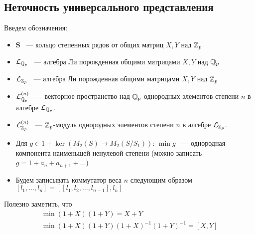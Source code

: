 \subsection{Неточность универсального представления}\label{subsec:zubkov-non-injective}
Введем обозначения:
\begin{itemize}
    \item $\mathbf{S}$ ~--- кольцо степенных рядов от общих матриц $X, Y$ над $\mathbb{Z}_p$
    \item $\mathcal{L}_{\mathbb{Q}_p}$ ~--- алгебра Ли порожденная общими матрицами $X, Y$ над $\mathbb{Q}_p$
    \item $\mathcal{L}_{\mathbb{Z}_p}$ ~--- алгебра Ли порожденная общими матрицами $X, Y$ над $\mathbb{Z}_p$
    \item $\mathcal{L}_{\mathbb{Q}_p}^{(n)}$ ~--- векторное пространство над $\mathbb{Q}_p$ однородных элементов степени $n$ в алгебре $\mathcal{L}_{\mathbb{Q}_p}$.
    \item $\mathcal{L}_{\mathbb{Z}_p}^{(n)}$ ~---  $\mathbb{Z}_p$-модуль однородных элементов степени $n$ в алгебре $\mathcal{L}_{\mathbb{Z}_p}$.
    \item Для $g\in 1 + \ker{(M_2(S) \to M_2(S / S_1))}$: $\min{g}$ ~--- однородная компонента наименьшей ненулевой степени (можно записать $g=1 + a_n + a_{n+1} + \ldots$)
    \item Будем записывать коммутатор веса $n$ следующим образом $[l_1, \ldots, l_n] = [[l_1, l_2, \ldots, l_{n-1}], l_n]$
\end{itemize}

\begin{remark}
    \label{rmk:group-vs-lie-commutator}
    Полезно заметить, что
    \begin{gather*}
        \min{(1 + X)(1+Y)} = X + Y\\
        \min{(1 + X)(1+Y)(1+X)^{-1}(1+Y)^{-1}} = [X, Y]\\
    \end{gather*}
\end{remark}


